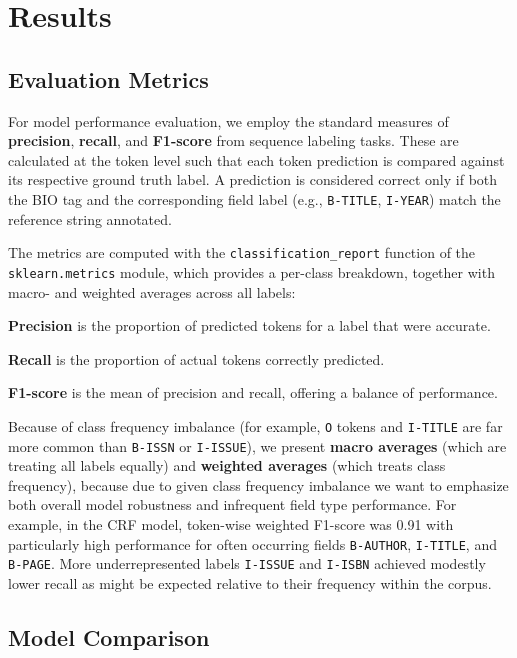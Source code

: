 \chapter{Results}
\label{ch:results}

\section{Evaluation Metrics}
For model performance evaluation, we employ the standard measures of \textbf{precision}, \textbf{recall}, and \textbf{F1-score} from sequence labeling tasks. These are calculated at the token level such that each token prediction is compared against its respective ground truth label. A prediction is considered correct only if both the BIO tag and the corresponding field label (e.g., \texttt{B-TITLE}, \texttt{I-YEAR}) match the reference string annotated.

The metrics are computed with the \texttt{classification\_report} function of the \texttt{sklearn.metrics} module, which provides a per-class breakdown, together with macro- and weighted averages across all labels:
\begin{compactitem}
\item \textbf{Precision} is the proportion of predicted tokens for a label that were accurate.
\item \textbf{Recall} is the proportion of actual tokens correctly predicted.
\item \textbf{F1-score} is the mean of precision and recall, offering a balance of performance.
\end{compactitem}
Because of class frequency imbalance (for example, \texttt{O} tokens and \texttt{I-TITLE} are far more common than \texttt{B-ISSN} or \texttt{I-ISSUE}), we present \textbf{macro averages} (which are treating all labels equally) and \textbf{weighted averages} (which treats class frequency), because due to given class frequency imbalance we want to emphasize both overall model robustness and infrequent field type performance.
For example, in the CRF model, token-wise weighted F1-score was 0.91 with particularly high performance for often occurring fields \texttt{B-AUTHOR}, \texttt{I-TITLE}, and \texttt{B-PAGE}. More underrepresented labels \texttt{I-ISSUE} and \texttt{I-ISBN} achieved modestly lower recall as might be expected relative to their frequency within the corpus.


\section{Model Comparison}
